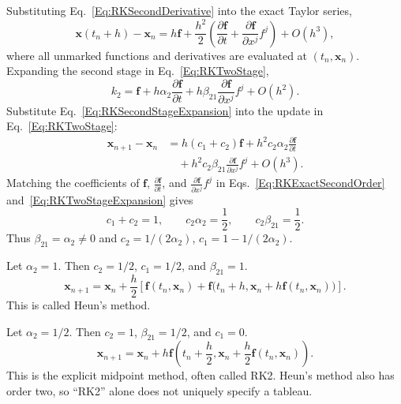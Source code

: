 Substituting Eq.~\ref{Eq:RKSecondDerivative} into the exact Taylor series,
\begin{equation}\label{Eq:RKExactSecondOrder}
 \mathbf x(t_n+h)-\mathbf x_n
 =h\mathbf f+\frac{h^2}{2}
       \left(\frac{\partial\mathbf f}{\partial t}
             +\frac{\partial\mathbf f}{\partial x^j}f^j\right)+O(h^3),
\end{equation}
where all unmarked functions and derivatives are evaluated at
$(t_n,\mathbf x_n)$. Expanding the second stage in Eq.~\ref{Eq:RKTwoStage},
\begin{equation}\label{Eq:RKSecondStageExpansion}
 k_2=\mathbf f+h\alpha_2\frac{\partial\mathbf f}{\partial t}
             +h\beta_{21}\frac{\partial\mathbf f}{\partial x^j}f^j+O(h^2).
\end{equation}
Substitute Eq.~\ref{Eq:RKSecondStageExpansion} into the update in
Eq.~\ref{Eq:RKTwoStage}:
\begin{equation}\label{Eq:RKTwoStageExpansion}
\begin{aligned}
 \mathbf x_{n+1}-\mathbf x_n
 &=h(c_1+c_2)\mathbf f+h^2c_2\alpha_2\frac{\partial\mathbf f}{\partial t}\\
 &\quad+h^2c_2\beta_{21}\frac{\partial\mathbf f}{\partial x^j}f^j+O(h^3).
\end{aligned}
\end{equation}
Matching the coefficients of $\mathbf f$, $\frac{\partial\mathbf f}{\partial t}$, and
$\frac{\partial\mathbf f}{\partial x^j}f^j$ in Eqs.~\ref{Eq:RKExactSecondOrder}
and~\ref{Eq:RKTwoStageExpansion} gives
\begin{equation}\label{Eq:RKTwoStageConditions}
 c_1+c_2=1,\qquad c_2\alpha_2=\frac12,
 \qquad c_2\beta_{21}=\frac12.
\end{equation}
Thus $\beta_{21}=\alpha_2\neq0$ and
$c_2=1/(2\alpha_2)$, $c_1=1-1/(2\alpha_2)$.

Let $\alpha_2=1$. Then $c_2=1/2$, $c_1=1/2$, and $\beta_{21}=1$.
\begin{equation}\label{Eq:RKHeun}
 \mathbf x_{n+1}=\mathbf x_n+\frac h2
 \left[\mathbf f(t_n,\mathbf x_n)
 +\mathbf f\bigl(t_n+h,\mathbf x_n+h\mathbf f(t_n,\mathbf x_n)\bigr)\right].
\end{equation}
This is called Heun's method.

Let $\alpha_2=1/2$. Then $c_2=1$, $\beta_{21}=1/2$, and $c_1=0$.
\begin{equation}\label{Eq:RKMidpoint}
 \mathbf x_{n+1}=\mathbf x_n+h\mathbf f\left(
 t_n+\frac h2,\mathbf x_n+\frac h2\mathbf f(t_n,\mathbf x_n)\right).
\end{equation}
This is the explicit midpoint method, often called RK2. Heun's method also
has order two, so ``RK2'' alone does not uniquely specify a tableau.

